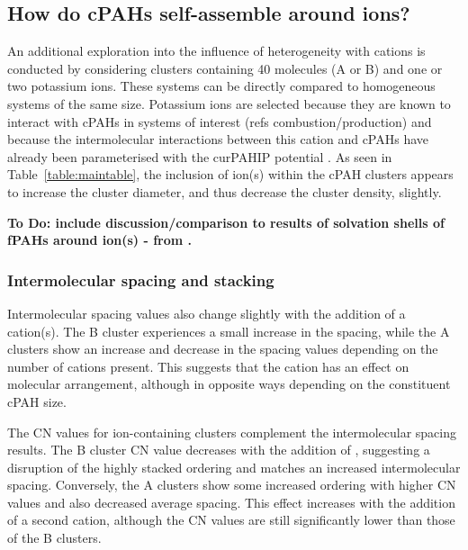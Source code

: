 \subsection{How do cPAHs self-assemble around ions?}
An additional exploration into the influence of heterogeneity with cations is conducted by considering clusters containing 40 molecules (A or B) and one or two potassium ions.  These systems can be directly compared to homogeneous systems of the same size. Potassium ions are selected because they are known to interact with cPAHs in systems of interest (refs combustion/production) and because the intermolecular interactions between this cation and cPAHs have already been parameterised with the curPAHIP potential \cite{bowal2019ion}. As seen in Table~\ref{table:maintable},
the inclusion of ion(s) within the cPAH clusters appears to increase the cluster diameter, and thus decrease the cluster density, slightly.

\textbf{To Do: include discussion/comparison to results of solvation shells of fPAHs around ion(s) - from \cite{bowal2019ion,bartolomei2019aggregation}.}

\subsubsection{Intermolecular spacing and stacking}
Intermolecular spacing values also change slightly with the addition of a cation(s). The B cluster experiences a small increase in the spacing, while the A clusters show an increase and decrease in the spacing values depending on the number of cations present. This suggests that the cation has an effect on molecular arrangement, although in opposite ways depending on the constituent cPAH size. %

The CN values for ion-containing clusters complement the intermolecular spacing results. The B cluster CN value decreases with the addition of , suggesting a disruption of the highly stacked ordering and matches an increased intermolecular spacing. Conversely, the A clusters show some increased ordering with higher CN values and also decreased average spacing. This effect increases with the addition of a second cation, although the CN values are still significantly lower than those of the B clusters.

